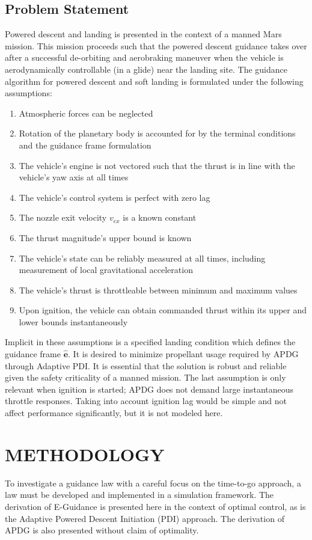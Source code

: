 \section{Problem Statement}

Powered descent and landing is presented in the context of a manned Mars mission. This mission proceeds such that the powered descent guidance takes over after a successful de-orbiting and aerobraking maneuver when the vehicle is aerodynamically controllable (in a glide) near the landing site. The guidance algorithm for powered descent and soft landing is formulated under the following assumptions:

\begin{enumerate}
	\item Atmospheric forces can be neglected
	\item Rotation of the planetary body is accounted for by the terminal conditions and the guidance frame formulation
	\item The vehicle's engine is not vectored such that the thrust is in line with the vehicle's yaw axis at all times
	\item The vehicle's control system is perfect with zero lag
	\item The nozzle exit velocity $v_{ex}$ is a known constant
	\item The thrust magnitude's upper bound is known
	\item The vehicle's state can be reliably measured at all times, including measurement of local gravitational acceleration
	\item The vehicle's thrust is throttleable between minimum and maximum values
	\item Upon ignition, the vehicle can obtain commanded thrust within its upper and lower bounds instantaneously
\end{enumerate}

Implicit in these assumptions is a specified landing condition which defines the guidance frame $\bm{\hat{e}}$. It is desired to minimize propellant usage required by APDG through Adaptive PDI. It is essential that the solution is robust and reliable given the safety criticality of a manned mission. The last assumption is only relevant when ignition is started; APDG does not demand large instantaneous throttle responses. Taking into account ignition lag would be simple and not affect performance significantly, but it is not modeled here.


 

\chapter{METHODOLOGY} \label{chap:methodology}
To investigate a guidance law with a careful focus on the time-to-go approach, a law must be developed and implemented in a simulation framework. The derivation of E-Guidance is presented here in the context of optimal control, as is the Adaptive Powered Descent Initiation (PDI) approach. The derivation of APDG is also presented without claim of optimality.

